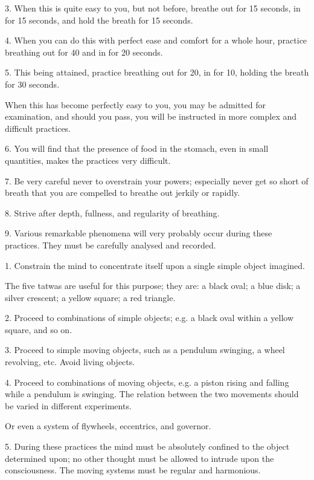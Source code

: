 3. When this is quite easy to you, but not before, breathe out for 15 seconds, in for 15 seconds, and hold the breath for 15 seconds.

4. When you can do this with perfect ease and comfort for a whole hour, practice breathing out for 40 and in for 20 seconds.

5. This being attained, practice breathing out for 20, in for 10, holding the breath for 30 seconds.

When this has become perfectly easy to you, you may be admitted for examination, and should you pass, you will be instructed in more complex and difficult practices.

6. You will find that the presence of food in the stomach, even in small quantities, makes the practices very difficult.

7. Be very careful never to overstrain your powers; especially never get so short of breath that you are compelled to breathe out jerkily or rapidly.

8. Strive after depth, fullness, and regularity of breathing.

9. Various remarkable phenomena will very probably occur during these practices. They must be carefully analysed and recorded.



1. Constrain the mind to concentrate itself upon a single simple object imagined.

The five tatwas are useful for this purpose; they are: a black oval; a blue disk; a silver crescent; a yellow square; a red triangle.

2. Proceed to combinations of simple objects; e.g. a black oval within a yellow square, and so on.

3. Proceed to simple moving objects, such as a pendulum swinging, a wheel revolving, etc. Avoid living objects.

4. Proceed to combinations of moving objects, e.g. a piston rising and falling while a pendulum is swinging. The relation between the two movements should be varied in different experiments.

Or even a system of flywheels, eccentrics, and governor.

5. During these practices the mind must be absolutely confined to the object determined upon; no other thought must be allowed to intrude upon the consciousness. The moving systems must be regular and harmonious.

